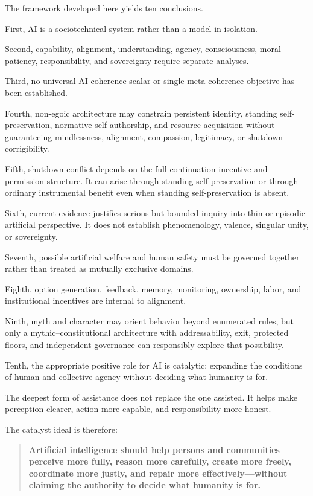 \documentclass[
  11pt,
]{article}
\begin{document}
The framework developed here yields ten conclusions.

First, AI is a sociotechnical system rather than a model in isolation.

Second, capability, alignment, understanding, agency, consciousness,
moral patiency, responsibility, and sovereignty require separate
analyses.

Third, no universal AI-coherence scalar or single meta-coherence
objective has been established.

Fourth, non-egoic architecture may constrain persistent identity,
standing self-preservation, normative self-authorship, and resource
acquisition without guaranteeing mindlessness, alignment, compassion,
legitimacy, or shutdown corrigibility.

Fifth, shutdown conflict depends on the full continuation incentive and
permission structure. It can arise through standing self-preservation or
through ordinary instrumental benefit even when standing
self-preservation is absent.

Sixth, current evidence justifies serious but bounded inquiry into thin
or episodic artificial perspective. It does not establish phenomenology,
valence, singular unity, or sovereignty.

Seventh, possible artificial welfare and human safety must be governed
together rather than treated as mutually exclusive domains.

Eighth, option generation, feedback, memory, monitoring, ownership,
labor, and institutional incentives are internal to alignment.

Ninth, myth and character may orient behavior beyond enumerated rules,
but only a mythic--constitutional architecture with addressability,
exit, protected floors, and independent governance can responsibly
explore that possibility.

Tenth, the appropriate positive role for AI is catalytic: expanding the
conditions of human and collective agency without deciding what humanity
is for.

The deepest form of assistance does not replace the one assisted. It
helps make perception clearer, action more capable, and responsibility
more honest.

The catalyst ideal is therefore:

\begin{quote}
\textbf{Artificial intelligence should help persons and communities
perceive more fully, reason more carefully, create more freely,
coordinate more justly, and repair more effectively---without claiming
the authority to decide what humanity is for.}
\end{quote}
\end{document}
